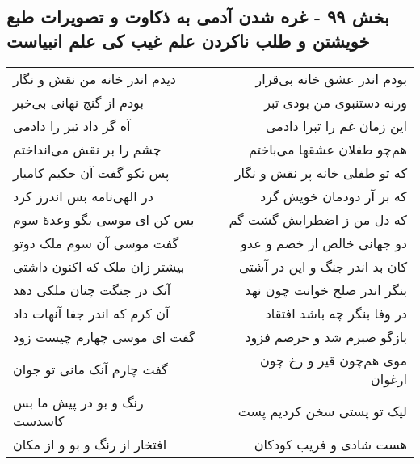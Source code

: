 \begin{center}
\section*{بخش ۹۹ - غره شدن آدمی به ذکاوت و تصویرات طبع خویشتن و طلب ناکردن علم  غیب کی علم انبیاست}
\label{sec:sh099}
\begin{longtable}{l p{0.5cm} r}
دیدم اندر خانه من نقش و نگار
&&
بودم اندر عشق خانه بی‌قرار
\\
بودم از گنج نهانی بی‌خبر
&&
ورنه دستنبوی من بودی تبر
\\
آه گر داد تبر را دادمی
&&
این زمان غم را تبرا دادمی
\\
چشم را بر نقش می‌انداختم
&&
هم‌چو طفلان عشقها می‌باختم
\\
پس نکو گفت آن حکیم کامیار
&&
که تو طفلی خانه پر نقش و نگار
\\
در الهی‌نامه بس اندرز کرد
&&
که بر آر دودمان خویش گرد
\\
بس کن ای موسی بگو وعدهٔ سوم
&&
که دل من ز اضطرابش گشت گم
\\
گفت موسی آن سوم ملک دوتو
&&
دو جهانی خالص از خصم و عدو
\\
بیشتر زان ملک که اکنون داشتی
&&
کان بد اندر جنگ و این در آشتی
\\
آنک در جنگت چنان ملکی دهد
&&
بنگر اندر صلح خوانت چون نهد
\\
آن کرم که اندر جفا آنهات داد
&&
در وفا بنگر چه باشد افتقاد
\\
گفت ای موسی چهارم چیست زود
&&
بازگو صبرم شد و حرصم فزود
\\
گفت چارم آنک مانی تو جوان
&&
موی هم‌چون قیر و رخ چون ارغوان
\\
رنگ و بو در پیش ما بس کاسدست
&&
لیک تو پستی سخن کردیم پست
\\
افتخار از رنگ و بو و از مکان
&&
هست شادی و فریب کودکان
\\
\end{longtable}
\end{center}
